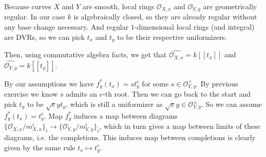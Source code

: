 \begin{exercise}{3}
    Because curves $X$ and $Y$ are smooth, local rings $\mathcal{O}_{X, x}$
    and $\mathcal{O}_{Y, y}$ are geometrically regular. In our case $k$ is
    algebraically closed, so they are already regular without any base
    change necessary.
    And regular $1$-dimensional local rings (and integral) are DVRs, so we can
    pick $t_x$ and $t_y$ to be their respective uniformizers.

    Then, using commutative algebra facts, we get that $\widehat{\mathcal{O}_{X,
    x}} = k[[t_x]]$ and $\widehat{\mathcal{O}_{Y, y}} = k[[t_y]]$.

    By our assumptions we have $f^*_y(t_x) = s t^e_y$ for some $s \in
    \mathcal{O}^\times_{Y, y}$. By previous exercise we know $s$ admits an
    $e$-th root. Then we can go back to the start and pick $t_y$ to be
    $\sqrt{e}{y} t_y$, which is still a uniformizer as $\sqrt{e}{y} \in
    \mathcal{O}^\times_{Y, y}$. So we can assume $f^*_y(t_x) = t^e_y$. Map
    $f^*_y$ induces a map between diagrams $\{ \mathcal{O}_{X, x}/m^i_{X, x}
    \}_i \to \{ \mathcal{O}_{Y, y}/m^i_{Y, y} \}_i$, which in turn gives a map
    between limits of these diagrams, i.e. the completions. This induces map
    between completions is clearly given by the same rule $t_x \mapsto t^e_y$.
\end{exercise}


